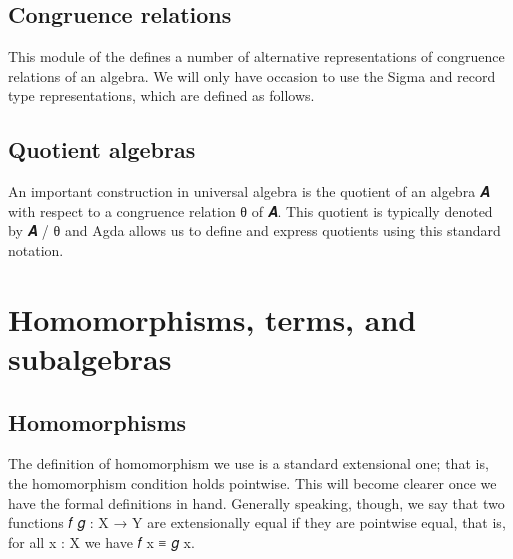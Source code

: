 \documentclass[a4paper,UKenglish,cleveref,autoref,thm-restate]{lipics-v2021}
\begin{document}
\subsection{Congruence relations}\label{ssec:congr-relat}
This \ualibCongruences module of the \agdaualib defines a number of alternative representations of congruence relations of an algebra. We will only have occasion to use the Sigma and record type representations, which are defined as follows.
\ccpad
\begin{code}%
  
\end{code}




\subsection{Quotient algebras}\label{ssec:quotient-algebras}
An important construction in universal algebra is the quotient of an algebra \ab 𝑨 with respect to a congruence relation \ab θ of \ab 𝑨. This quotient is typically denoted by \ab 𝑨 \as / \ab θ and Agda allows us to define and express quotients using this standard notation.
\ccpad
\begin{code}%
  
\end{code}







\section{Homomorphisms, terms, and subalgebras}\label{sec:homom-terms-subalg}

\subsection{Homomorphisms}\label{ssec:homomorphisms}

The definition of homomorphism we use is a standard extensional one; that is, the homomorphism condition holds pointwise. This will become clearer once we have the formal definitions in hand. Generally speaking, though, we say that two functions \ab 𝑓 \ab 𝑔 \as : \ab X \as → \ab Y are extensionally equal if they are pointwise equal, that is, for all \ab x \as : \ab X we have \ab 𝑓 \ab x \af ≡ \ab 𝑔 \ab x.
\end{document}
